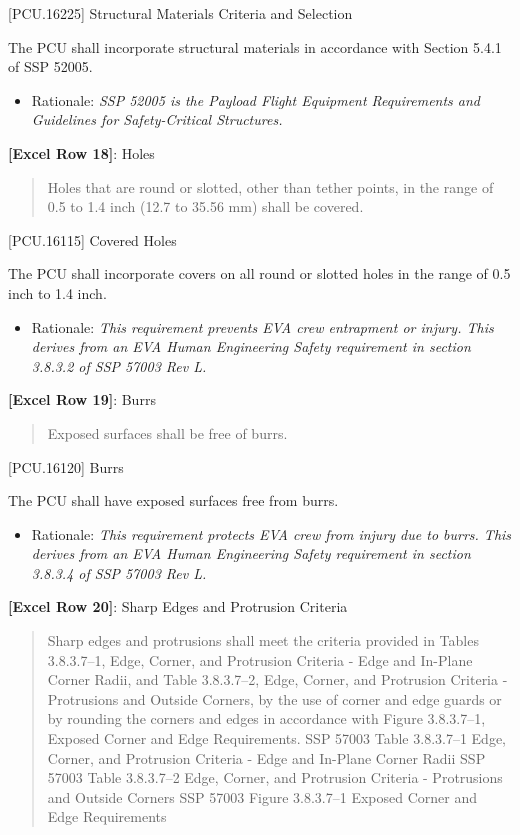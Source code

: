 [PCU.16225] Structural Materials Criteria and Selection

The PCU shall incorporate structural materials in accordance with Section 5.4.1 of SSP 52005.

\begin{itemize}
\item{} Rationale: \emph{SSP 52005 is the Payload Flight Equipment Requirements and Guidelines for Safety-Critical Structures.}

\end{itemize}

\textbf{[Excel Row 18]}: Holes

\begin{quote}
Holes that are round or slotted, other than tether points, in the range of 0.5 to 1.4 inch (12.7 to 35.56 mm) shall be covered.
\end{quote}

[PCU.16115] Covered Holes

The PCU shall incorporate covers on all round or slotted holes in the range of 0.5 inch to 1.4 inch.

\begin{itemize}
\item{} Rationale: \emph{This requirement prevents EVA crew entrapment or injury. This derives from an EVA Human Engineering Safety requirement in section 3.8.3.2 of SSP 57003 Rev L.}

\end{itemize}

\textbf{[Excel Row 19]}: Burrs

\begin{quote}
Exposed surfaces shall be free of burrs.
\end{quote}

[PCU.16120] Burrs

The PCU shall have exposed surfaces free from burrs.

\begin{itemize}
\item{} Rationale: \emph{This requirement protects EVA crew from injury due to burrs. This derives from an EVA Human Engineering Safety requirement in section 3.8.3.4 of SSP 57003 Rev L.}

\end{itemize}

\textbf{[Excel Row 20]}: Sharp Edges and Protrusion Criteria

\begin{quote}
Sharp edges and protrusions shall meet the criteria provided in Tables 3.8.3.7--1, Edge, Corner, and Protrusion Criteria - Edge and In-Plane Corner Radii, and Table 3.8.3.7--2, Edge, Corner, and Protrusion Criteria - Protrusions and Outside Corners, by the use of corner and edge guards or by rounding the corners and edges in accordance with Figure 3.8.3.7--1, Exposed Corner and Edge Requirements.
SSP 57003 Table 3.8.3.7--1 Edge, Corner, and Protrusion Criteria - Edge and In-Plane Corner Radii
SSP 57003 Table 3.8.3.7--2 Edge, Corner, and Protrusion Criteria - Protrusions and Outside Corners
SSP 57003 Figure 3.8.3.7--1 Exposed Corner and Edge Requirements
\end{quote}


